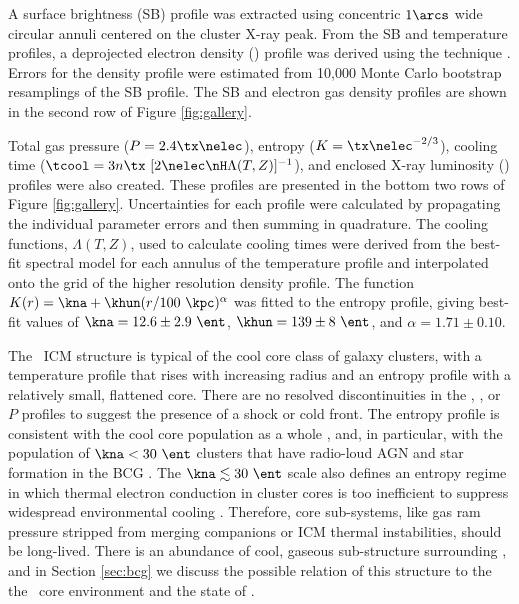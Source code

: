 \documentclass[useAMS,usenatbib]{mn2e}
\begin{document}
A surface brightness (SB) profile was extracted using concentric
$1\arcs$ wide circular annuli centered on the cluster X-ray peak. From
the SB and temperature profiles, a deprojected electron density
(\nelec) profile was derived using the \citet{kriss83} technique
\citep[see][for more detail]{accept}. Errors for the density profile
were estimated from 10,000 Monte Carlo bootstrap resamplings of the SB
profile. The SB and electron gas density profiles are shown in the
second row of Figure \ref{fig:gallery}.

Total gas pressure ($P = 2.4 \tx \nelec$), entropy ($K =
\tx\nelec^{-2/3}$), cooling time ($\tcool = 3n\tx~[2\nelec \nH
  \Lambda(T,Z)]^{-1}$), and enclosed X-ray luminosity (\lx) profiles
were also created. These profiles are presented in the bottom two rows
of Figure \ref{fig:gallery}. Uncertainties for each profile were
calculated by propagating the individual parameter errors and then
summing in quadrature. The cooling functions, $\Lambda(T,Z)$, used to
calculate cooling times were derived from the best-fit spectral model
for each annulus of the temperature profile and interpolated onto the
grid of the higher resolution density profile. The function $K(r) =
\kna +\khun (r/100 ~\kpc)^{\alpha}$ was fitted to the entropy profile,
giving best-fit values of $\kna = 12.6 \pm 2.9 ~\ent$, $\khun = 139
\pm 8 ~\ent$, and $\alpha = 1.71 \pm 0.10$.

The \rxj\ ICM structure is typical of the cool core class of galaxy
clusters, with a temperature profile that rises with increasing radius
and an entropy profile with a relatively small, flattened core. There
are no resolved discontinuities in the \tx, \nelec, or $P$ profiles to
suggest the presence of a shock or cold front.  The entropy profile is
consistent with the cool core population as a whole \citep{accept},
and, in particular, with the population of $\kna < 30 ~\ent$ clusters
that have radio-loud AGN and star formation in the BCG
\citep{haradent}. The $\kna \la 30 ~\ent$ scale also defines an
entropy regime in which thermal electron conduction in cluster cores
is too inefficient to suppress widespread environmental cooling
\citep{conduction}. Therefore, core sub-systems, like gas ram pressure
stripped from merging companions or ICM thermal instabilities, should
be long-lived. There is an abundance of cool, gaseous sub-structure
surrounding \irs, and in Section \ref{sec:bcg} we discuss the possible
relation of this structure to the the \rxj\ core environment and the
state of \irs.

\end{document}

